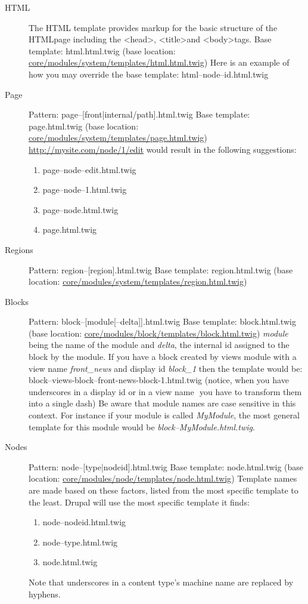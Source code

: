 \begin{description}
	\item[HTML] The HTML template provides markup for the basic structure of the HTML­page including the \textless head\textgreater, \textless title\textgreater  and \textless body\textgreater  tags.
	Base template: html.html.twig (base location: \url{core/modules/system/templates/html.html.twig}) 
	Here is an example of how you may override the base template:
	html--node--id.html.twig
	
	\item[Page] Pattern: page--[front|internal/path].html.twig
	Base template: page.html.twig (base location:
	\url{core/modules/system/templates/page.html.twig})
	\url{http://mysite.com/node/1/edit} would result in the following suggestions:
	\begin{enumerate}
		\item page--node--edit.html.twig
		\item page--node--1.html.twig
		\item page--node.html.twig
		\item page.html.twig
	\end{enumerate}
	
	\item[Regions] Pattern: region--[region].html.twig
	Base template: region.html.twig (base location:
	\url{core/modules/system/templates/region.html.twig})


	\item[Blocks] Pattern: block--[module[--­delta]].html.twig
	Base template: block.html.twig (base location: \url{core/modules/block/templates/block.html.twig})
	\textit{module} being the name of the module and \textit{delta}, the internal id assigned to the block by the module.
	If you have a block created by views module with a view name \textit{front\_news} and display id \textit{block\_1} then the template would be:
	block--views-block--front-news-block-1.html.twig (notice, when you have underscores in a display id or in a view name ­ you have to transform them into a single dash) Be aware that module names are case sensitive in this context. For instance if your module is called \textit{MyModule}, the most general template for this module would be
	\textit{block--MyModule.html.twig}.
	
	\item[Nodes] Pattern: node--[type|nodeid].html.twig
	Base template: node.html.twig (base location: \url{core/modules/node/templates/node.html.twig})
	Template names are made based on these factors, listed from the most specific template to
	the least. Drupal will use the most specific template it finds:
	\begin{enumerate}
		\item node--nodeid.html.twig
		\item node--type.html.twig
		\item node.html.twig
	\end{enumerate}
	Note that underscores in a content type's machine name are replaced by hyphens.


\end{description}
